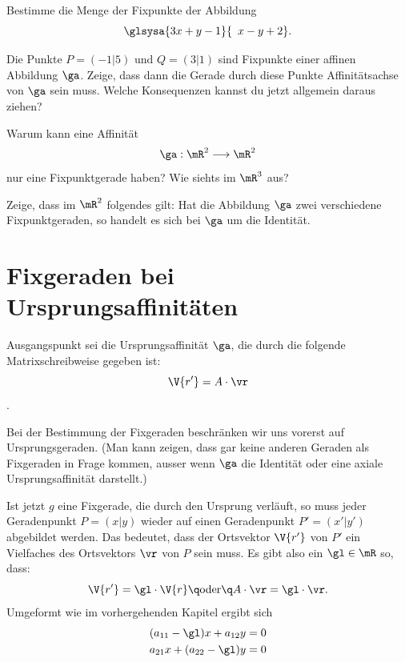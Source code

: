 \documentclass[%
11pt,%
twoside,%
titlepage,%
german,%
headsepline%
]{scrartcl}
\begin{document}
\begin{ueb}
Bestimme die Menge der Fixpunkte der Abbildung
$$\glsysa{3x+y-1}{\phantom{3}x-y+2}.$$
\end{ueb}

\begin{ueb}
Die Punkte $P=(-1|5)$ und $Q=(3|1)$ sind Fixpunkte einer affinen Abbildung $\ga$. Zeige, dass dann die Gerade durch diese Punkte Affinitätsachse von $\ga$ sein muss.
Welche Konsequenzen kannst du jetzt allgemein daraus ziehen?
\end{ueb}

\begin{ueb}
Warum kann eine Affinität
$$\ga:\mR^2\longrightarrow\mR^2$$
nur eine Fixpunktgerade haben? Wie siehts im $\mR^3$ aus?
\end{ueb}

\begin{ueb}
Zeige, dass im $\mR^2$ folgendes gilt: Hat die Abbildung $\ga$ zwei verschiedene Fixpunktgeraden, so handelt es sich bei $\ga$ um die Identität.
\end{ueb}

\section{Fixgeraden bei Ursprungsaffinitäten}
Ausgangspunkt sei die Ursprungsaffinität $\ga$, die durch die folgende Matrixschreibweise gegeben ist:
$$\V{r'}=A\cdot\vr$$.

\begin{bem}
Bei der Bestimmung der Fixgeraden beschränken wir uns vorerst auf Ursprungsgeraden. (Man kann zeigen, dass gar keine anderen Geraden als Fixgeraden in Frage kommen, ausser wenn $\ga$ die Identität oder eine axiale Ursprungsaffinität darstellt.)
\end{bem}

Ist
jetzt $g$ eine Fixgerade, die durch den Ursprung verläuft, so muss jeder Geradenpunkt $P =(x|y)$ wieder auf einen Geradenpunkt $P'=(x'|y')$ abgebildet werden. Das bedeutet, dass der Ortsvektor $\V{r'}$ von $P'$ ein Vielfaches des Ortsvektors $\vr$ von $P$ sein muss. Es gibt also ein $\gl\in\mR$ so, dass:
$$\V{r'}=\gl\cdot\V{r}\q\text{oder}\q A\cdot\vr=\gl\cdot\vr.$$
Umgeformt wie im vorhergehenden Kapitel ergibt sich
\begin{align*}
(a_{11}-\gl)x+a_{12}y &= 0\\
a_{21}x+(a_{22}-\gl)y &= 0
\end{align*}
\end{document}
